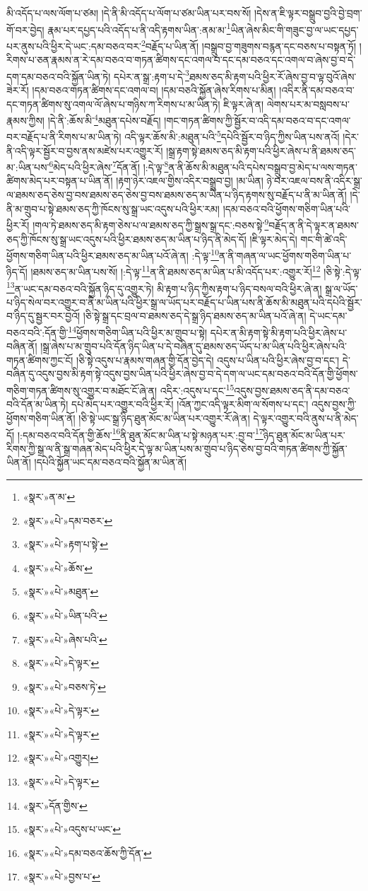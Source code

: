 མི་འདོད་པ་ལས་ལོག་པ་ཙམ། །དེ་ནི་མི་འདོད་པ་ལོག་པ་ཙམ་ཡིན་པར་བས་སོ། །དེས་ན་ཇི་ལྟར་བསྒྲུབ་བྱའི་བྱེ་བྲག་གོ་བར་བྱེད། རྣམ་པར་དཔྱད་པའི་འདོད་པ་ནི་འདི་རྟགས་ཡིན་:ནམ་མ་\footnote{«སྣར་»ན་མ་}ཡིན་ཞེས་མིང་གི་གཟུང་བྱ་ལ་ཡང་དཔྱད་པར་ནུས་པའི་ཕྱིར་དེ་ཡང་:དམ་བཅའ་བར་\footnote{«སྣར་»«པེ་»དམ་བཅར་}བརྗོད་པ་ཡིན་ནོ། །བསྒྲུབ་བྱ་གཟུགས་བརྙན་དང་བཅས་པ་བསྟན་ཏོ། །རིགས་པ་ཅན་རྣམས་ན་རེ་དམ་བཅའ་བ་གཏན་ཚིགས་དང་འགལ་བ་དང་དམ་བཅའ་དང་འགལ་བ་ཞེས་བྱ་བ་དེ་དག་དམ་བཅའ་བའི་སྐྱོན་ཡིན་ཏེ། དཔེར་ན་སྒྲ་:རྟག་པ་དེ་\footnote{«སྣར་»«པེ་»རྟག་པ་སྟེ་}ཐམས་ཅད་མི་རྟག་པའི་ཕྱིར་རོ་ཞེས་བྱ་བ་ལྟ་བུའོ་ཞེས་ཟེར་རོ། །དམ་བཅའ་གཏན་ཚིགས་དང་འགལ་བ། །དམ་བཅའི་སྐྱོན་ཞེས་རིགས་པ་མིན། །འདིར་ནི་དམ་བཅའ་བ་དང་གཏན་ཚིགས་སུ་འགལ་ལོ་ཞེས་པ་གཉིས་ཀ་རིགས་པ་མ་ཡིན་ཏེ། ཇི་ལྟར་ཞེ་ན། ལེགས་པར་མ་བསླབས་པ་རྣམས་ཀྱིས། །དེ་ནི་:ཆོས་མི་\footnote{«སྣར་»«པེ་»ཆོས་}མཐུན་དཔེས་བརྗོད། །གང་གཏན་ཚིགས་ཀྱི་སྦྱོར་བ་འདི་དམ་བཅའ་བ་དང་འགལ་བར་བརྗོད་པ་ནི་རིགས་པ་མ་ཡིན་ཏེ། འདི་ལྟར་ཆོས་མི་:མཐུན་པའི་\footnote{«སྣར་»«པེ་»མཐུན་}དཔེའི་སྦྱོར་བ་ཉིད་ཀྱིས་ཡིན་པས་ནའོ། །དེར་ནི་འདི་ལྟར་སྦྱོར་བ་བྱས་ནས་མཛེས་པར་འགྱུར་རོ། །སྒྲ་རྟག་སྟེ་ཐམས་ཅད་མི་རྟག་པའི་ཕྱིར་ཞེས་པ་ནི་ཐམས་ཅད་མ་:ཡིན་པས་\footnote{«སྣར་»«པེ་»ཡིན་པའི་}མེད་པའི་ཕྱིར་ཞེས་\footnote{«སྣར་»«པེ་»ཞེས་པའི་}དོན་ནོ། །:དེ་ལྟ་\footnote{«སྣར་»«པེ་»དེ་ལྟར་}ན་ནི་ཆོས་མི་མཐུན་པའི་དཔེས་བསྒྲུབ་བྱ་མེད་པ་ལས་གཏན་ཚིགས་མེད་པར་བསྟན་པ་ཡིན་ནོ། །རྟག་ཉེར་འཇལ་གྱིས་འདིར་བསྒྲུབ་བྱ། །མ་ཡིན། ཉེ་བར་འཇལ་བས་ནི་འདིར་སྒྲ་ལ་ཐམས་ཅད་ཅེས་བྱ་བས་ཐམས་ཅད་ཅེས་བྱ་བས་ཐམས་ཅད་མ་ཡིན་པ་ཉིད་རྟགས་སུ་བརྗོད་པ་ནི་མ་ཡིན་ནོ། །དེ་ནི་མ་གྲུབ་པ་སྟེ་ཐམས་ཅད་ཀྱི་ཁོངས་སུ་སྒྲ་ཡང་འདུས་པའི་ཕྱིར་རམ། །དམ་བཅའ་བའི་ཕྱོགས་གཅིག་ཡིན་པའི་ཕྱིར་རོ། །གལ་ཏེ་ཐམས་ཅད་མི་རྟག་ཅེས་པ་ལ་ཐམས་ཅད་ཀྱི་སྒྲས་སྒྲ་དང་:བཅས་སྟེ་\footnote{«སྣར་»«པེ་»བཅས་ཏེ་}བརྗོད་ན་ནི་དེ་ལྟར་ན་ཐམས་ཅད་ཀྱི་ཁོངས་སུ་སྒྲ་ཡང་འདུས་པའི་ཕྱིར་ཐམས་ཅད་མ་ཡིན་པ་ཉིད་ནི་མེད་དོ། །ཇི་ལྟར་མེད་དེ། གང་གི་ཚེ་འདི་ཕྱོགས་གཅིག་ཡིན་པའི་ཕྱིར་ཐམས་ཅད་མ་ཡིན་པའོ་ཞེ་ན། :དེ་ལྟ་\footnote{«སྣར་»«པེ་»དེ་ལྟར་}ན་ནི་གཞན་ལ་ཡང་ཕྱོགས་གཅིག་ཡིན་པ་ཉིད་དོ། །ཐམས་ཅད་མ་ཡིན་པས་སོ། །:དེ་ལྟ་\footnote{«སྣར་»«པེ་»དེ་ལྟར་}ན་ནི་ཐམས་ཅད་མ་ཡིན་པ་མི་འདོད་པར་:འགྱུར་རོ།\footnote{«སྣར་»«པེ་»འགྱུར།} །ཅི་སྟེ་:དེ་ལྟ་\footnote{«སྣར་»«པེ་»དེ་ལྟར་}ན་ཡང་དམ་བཅའ་བའི་སྐྱོན་ཉིད་དུ་འགྱུར་ཏེ། མི་རྟག་པ་ཉིད་ཀྱིས་རྟག་པ་ཉིད་བསལ་བའི་ཕྱིར་ཞེ་ན། སྒྲ་ལ་ཡོད་པ་ཉིད་སེལ་བར་འགྱུར་བ་ནི་མ་ཡིན་པའི་ཕྱིར་སྒྲ་ལ་ཡོད་པར་བརྗོད་པ་ཡིན་པས་ནི་ཆོས་མི་མཐུན་པའི་དཔེའི་སྦྱོར་བ་ཉིད་དུ་སྦྱར་བར་བྱའོ། །ཅི་སྟེ་སྒྲ་དང་བྲལ་བ་ཐམས་ཅད་དེ་སྒྲ་ཉིད་ཐམས་ཅད་མ་ཡིན་པའོ་ཞེ་ན། དེ་ཡང་དམ་བཅའ་བའི་:དོན་གྱི་\footnote{«སྣར་»དོན་གྱིས་}ཕྱོགས་གཅིག་ཡིན་པའི་ཕྱིར་མ་གྲུབ་པ་སྟེ། དཔེར་ན་མི་རྟག་སྟེ་མི་རྟག་པའི་ཕྱིར་ཞེས་པ་བཞིན་ནོ། །སྒྲ་ཞེས་པ་མ་གྲུབ་པའི་དོན་ཉིད་ཡིན་པ་དེ་བཞིན་དུ་ཐམས་ཅད་ཡོད་པ་མ་ཡིན་པའི་ཕྱིར་ཞེས་པའི་གཏན་ཚིགས་ཀྱང་ངོ། །ཅི་སྟེ་འདུས་པ་རྣམས་གཞན་གྱི་དོན་བྱེད་དེ། འདུས་པ་ཡིན་པའི་ཕྱིར་ཞེས་བྱ་བ་དང་། དེ་བཞིན་དུ་འདུས་བྱས་མི་རྟག་སྟེ་འདུས་བྱས་ཡིན་པའི་ཕྱིར་ཞེས་བྱ་བ་དེ་དག་ལ་ཡང་དམ་བཅའ་བའི་དོན་གྱི་ཕྱོགས་གཅིག་གཏན་ཚིགས་སུ་འགྱུར་བ་མཐོང་ངོ་ཞེ་ན། འདིར་:འདུས་པ་དང་\footnote{«སྣར་»«པེ་»འདུས་པ་ཡང་}འདུས་བྱས་ཐམས་ཅད་ནི་དམ་བཅའ་བའི་དོན་མ་ཡིན་ཏེ། དཔེ་མེད་པར་འགྱུར་བའི་ཕྱིར་རོ། །འོན་ཀྱང་འདི་ལྟར་མིག་ལ་སོགས་པ་དང་། འདུས་བྱས་ཀྱི་ཕྱོགས་གཅིག་ཡིན་ནོ། །ཅི་སྟེ་ཡང་སྒྲ་ཉིད་ཐུན་མོང་མ་ཡིན་པར་འགྱུར་རོ་ཞེ་ན། དེ་ལྟར་འགྱུར་བའི་ནུས་པ་ནི་མེད་དོ། །:དམ་བཅའ་བའི་དོན་གྱི་ཆོས་\footnote{«སྣར་»«པེ་»དམ་བཅའ་ཆོས་ཀྱི་དོན་}ནི་ཐུན་མོང་མ་ཡིན་པ་སྟེ་མཉན་པར་:བྱ་བ་\footnote{«སྣར་»«པེ་»བྱས་པ་}ཉིད་ཐུན་མོང་མ་ཡིན་པར་རིགས་ཀྱི་སྒྲ་ལ་ནི་སྒྲ་གཞན་མེད་པའི་ཕྱིར་དེ་ལྟ་མ་ཡིན་པས་མ་གྲུབ་པ་ཉིད་ཅེས་བྱ་བའི་གཏན་ཚིགས་ཀྱི་སྐྱོན་ཡིན་ནོ། །དཔེའི་སྐྱོན་ཡང་དམ་བཅའ་བའི་སྐྱོན་མ་ཡིན་ནོ། 